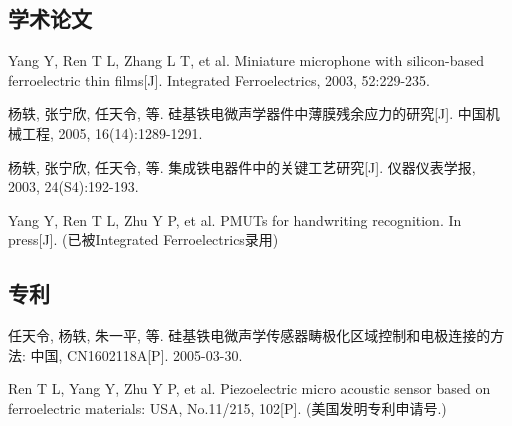 
\begin{resume}







  \subsection*{学术论文}

  \begin{achievements}
    \item Yang Y, Ren T L, Zhang L T, et al. Miniature microphone with silicon-based ferroelectric thin films[J]. Integrated Ferroelectrics, 2003, 52:229-235.
    \item 杨轶, 张宁欣, 任天令, 等. 硅基铁电微声学器件中薄膜残余应力的研究[J]. 中国机械工程, 2005, 16(14):1289-1291.
    \item 杨轶, 张宁欣, 任天令, 等. 集成铁电器件中的关键工艺研究[J]. 仪器仪表学报, 2003, 24(S4):192-193.
    \item Yang Y, Ren T L, Zhu Y P, et al. PMUTs for handwriting recognition. In press[J]. (已被Integrated Ferroelectrics录用)
  \end{achievements}


  \subsection*{专利}

  \begin{achievements}
    \item 任天令, 杨轶, 朱一平, 等. 硅基铁电微声学传感器畴极化区域控制和电极连接的方法: 中国, CN1602118A[P]. 2005-03-30.
    \item Ren T L, Yang Y, Zhu Y P, et al. Piezoelectric micro acoustic sensor based on ferroelectric materials: USA, No.11/215, 102[P]. (美国发明专利申请号.)
  \end{achievements}

\end{resume}



